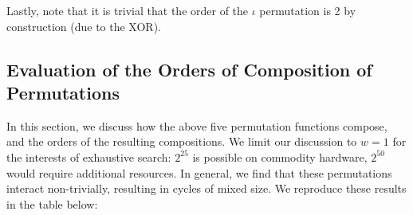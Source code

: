 \documentclass[10pt,twocolumn,twoside]{pnas-new}
\begin{document}
Lastly, note that it is trivial that the order of the $\iota$ permutation is
2 by construction (due to the XOR).

\subsection{Evaluation of the Orders of Composition of Permutations} \label{sec:p:composition}

In this section, we discuss how the above five permutation functions compose,
and the orders of the resulting compositions. We limit our discussion to $w=1$
for the interests of exhaustive search: $2^{25}$ is possible on commodity
hardware, $2^{50}$ would require additional resources. In general, we find that
these permutations interact non-trivially, resulting in cycles of mixed size.
We reproduce these results in the table below:
\end{document}
